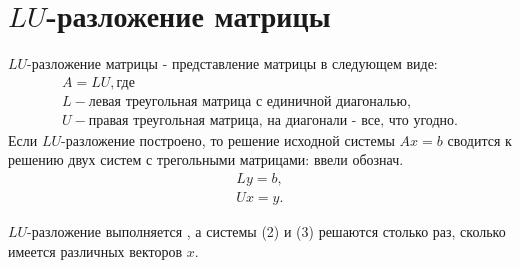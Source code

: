 \documentclass[a4paper,11pt]{article}
\begin{document}
\section{$LU$-разложение матрицы}
$LU$-разложение матрицы - представление матрицы в следующем виде:
\begin{gather*}
  A = LU, \text{где} \\
  L - \text{левая треугольная матрица с единичной диагональю}, \\
  U - \text{правая треугольная матрица, на диагонали - все, что угодно}.
\end{gather*}
Если $LU$-разложение построено, то решение исходной системы $Ax=b$ сводится к решению двух систем с трегольными матрицами:
\marginpar
{
  \vspace{11mm}
  \footnotesize ввели обознач.
}
\begin{gather}
  Ly=b, \\ Ux=y.
\end{gather}

$LU$-разложение выполняется , а системы (2) и (3) решаются столько раз, сколько имеется различных векторов $x$. \\
\end{document}
